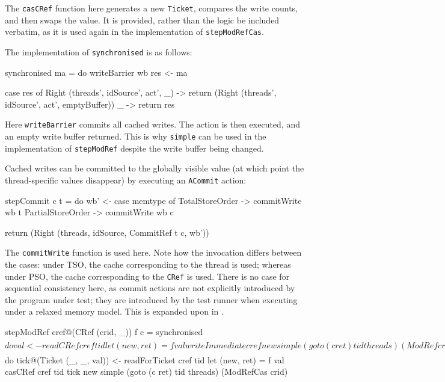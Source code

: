 
The \verb|casCRef| function here generates a new \verb|Ticket|,
compares the write counts, and then swaps the value. It is provided,
rather than the logic be included verbatim, as it is used again in the
implementation of \verb|stepModRefCas|.

The implementation of \verb|synchronised| is as follows:

\begin{haskellcode}
synchronised ma = do
  writeBarrier wb
  res <- ma

  case res of
    Right (threads', idSource', act', _) -> return
      (Right (threads', idSource', act', emptyBuffer))
    _ -> return res
\end{haskellcode}

Here \verb|writeBarrier| commits all cached writes. The action is then
executed, and an empty write buffer returned. This is why
\verb|simple| can be used in the implementation of \verb|stepModRef|
despite the write buffer being changed.

Cached writes can be committed to the globally visible value (at which
point the thread-specific values disappear) by executing an
\verb|ACommit| action:

\begin{haskellcode}
stepCommit c t = do
  wb' <- case memtype of
    TotalStoreOrder   -> commitWrite wb t
    PartialStoreOrder -> commitWrite wb c

  return (Right (threads, idSource, CommitRef t c, wb'))
\end{haskellcode}

The \verb|commitWrite| function is used here. Note how the invocation
differs between the cases: under TSO, the cache corresponding to the
thread is used; whereas under PSO, the cache corresponding to the
\verb|CRef| is used. There is no case for sequential consistency here,
as commit actions are not explicitly introduced by the program under
test; they are introduced by the test runner when executing under a
relaxed memory model. This is expanded upon in
.

\begin{haskellcode}
stepModRef cref@(CRef (crid, _)) f c = synchronised $ do
  val <- readCRef cref tid
  let (new, ret) = f val
  writeImmediate cref new
  simple (goto (c ret) tid threads) (ModRef crid)

stepModRefCas cref@(CRef (crid, _)) f c = synchronised $ do
  tick@(Ticket (_, _, val)) <- readForTicket cref tid
  let (new, ret) = f val
  casCRef cref tid tick new
  simple (goto (c ret) tid threads) (ModRefCas crid)
\end{haskellcode}

